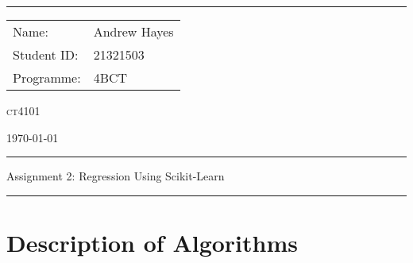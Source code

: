 \documentclass[a4paper, 10pt]{article}
\begin{document}
\hrule \medskip
\begin{minipage}{0.295\textwidth} 
    \vfill
    \raggedright
    \footnotesize 
    \begin{tabular}{@{}l l} %
        Name: & Andrew Hayes \\
        Student ID: & 21321503 \\
        Programme: & 4BCT \\
    \end{tabular}
    \vfill
\end{minipage}
\begin{minipage}{0.4\textwidth} 
    \centering 
    \LARGE 
    \vfill
    \textsc{ct4101}
    \vfill
\end{minipage}
\begin{minipage}{0.295\textwidth} 
    \raggedleft
    \vfill
    \today
    \vfill
\end{minipage}
\smallskip
\hrule 
\begin{center}
    \normalsize
    Assignment 2: Regression Using Scikit-Learn
\end{center}
\hrule

\section{Description of Algorithms}
\end{document}
